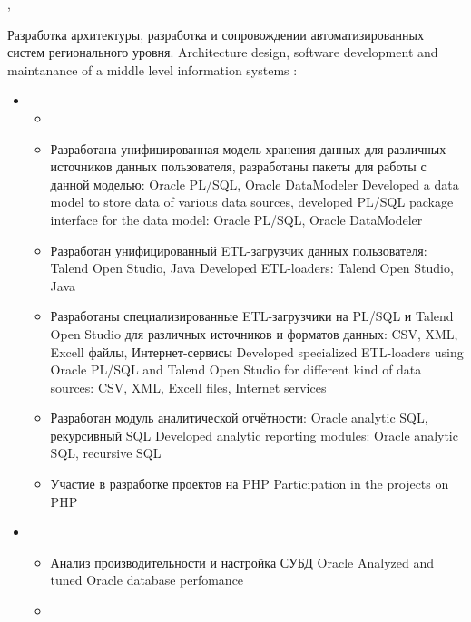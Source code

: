 \documentclass[11pt,a4paper,sans]{moderncv}        %
\begin{document}
{\protect{}}
{\cityperm, \country}
{}
{
	{Разработка архитектуры, разработка и сопровождении автоматизированных систем регионального уровня.}
	{Architecture design, software development and maintanance of a middle level information systems}
  \newline{}
	\achievements:
	\begin{itemize}
	\item {}
		\begin{itemize}
			\item {}
			\item {}
				{Разработана унифицированная модель хранения данных для различных источников данных пользователя, разработаны пакеты для работы с данной моделью: Oracle PL/SQL, Oracle DataModeler}
				{Developed a data model to store data of various data sources, developed PL/SQL package interface for the data model: Oracle PL/SQL, Oracle DataModeler}
			\item {}
				{Разработан унифицированный ETL-загрузчик данных пользователя: Talend Open Studio, Java}
				{Developed ETL-loaders: Talend Open Studio, Java}
			\item {}
				{Разработаны специализированные ETL-загрузчики на PL/SQL и Talend Open Studio для различных источников и форматов данных: CSV, XML, Excell файлы, Интернет-сервисы}
				{Developed specialized ETL-loaders using Oracle PL/SQL and Talend Open Studio for different kind of data sources: CSV, XML, Excell files, Internet services}
			\item {}
				{Разработан модуль аналитической отчётности: Oracle analytic SQL, рекурсивный SQL}		
				{Developed analytic reporting modules: Oracle analytic SQL, recursive SQL}
			\item {}
				{Участие в разработке проектов на PHP}
				{Participation in the projects on PHP}
		\end{itemize}
	\item {}
		\begin{itemize}
			\item {}
				{Анализ производительности и настройка СУБД Oracle}
				{Analyzed and tuned Oracle database perfomance}
			\item {}

\end{itemize}
\end{itemize}}
\end{document}

